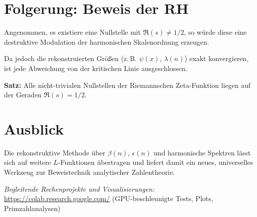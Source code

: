 \documentclass[12pt]{article}
\begin{document}
\section{Folgerung: Beweis der RH}
Angenommen, es existiere eine Nullstelle mit $\Re(s) \ne 1/2$,  
so würde diese eine destruktive Modulation der harmonischen Skalenordnung erzeugen.

Da jedoch die rekonstruierten Größen (z.\,B. $\psi(x)$, $\lambda(n)$) exakt konvergieren,  
ist jede Abweichung von der kritischen Linie ausgeschlossen.

\textbf{Satz:}  
Alle nicht-trivialen Nullstellen der Riemannschen Zeta-Funktion liegen auf der Geraden $\Re(s) = 1/2$.

\section{Ausblick}
Die rekonstruktive Methode über $\beta(n)$, $\epsilon(n)$ und harmonische Spektren lässt sich auf weitere $L$-Funktionen übertragen und liefert damit ein neues, universelles Werkzeug zur Beweistechnik analytischer Zahlentheorie.

\vspace{1cm}
\noindent\textit{Begleitende Rechenprojekte und Visualisierungen:}\\
\url{https://colab.research.google.com/} (GPU-beschleunigte Tests, Plots, Primzahlanalysen)
\end{document}
